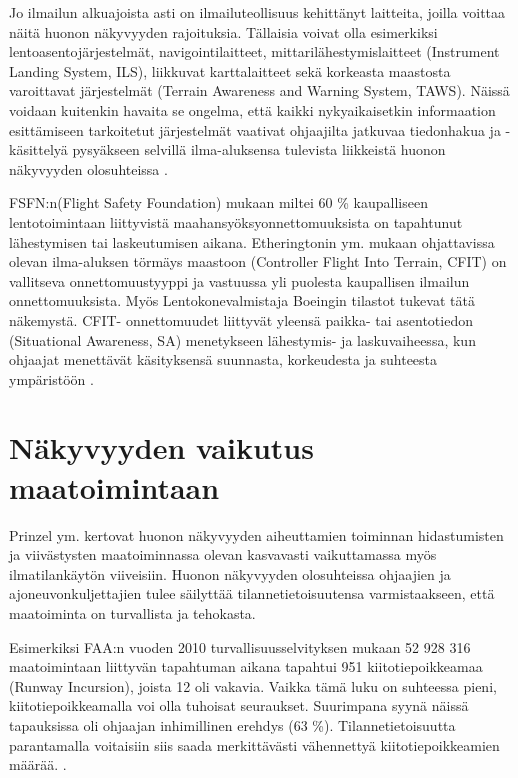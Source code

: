 \documentclass[utf8,bachelor,manualbib]{gradu3}
\begin{document}
Jo ilmailun alkuajoista asti on ilmailuteollisuus kehittänyt laitteita, joilla voittaa näitä huonon näkyvyyden rajoituksia. Tällaisia voivat olla esimerkiksi lentoasentojärjestelmät, navigointilaitteet, mittarilähestymislaitteet (Instrument Landing System, ILS), liikkuvat karttalaitteet sekä korkeasta maastosta varoittavat järjestelmät (Terrain Awareness and Warning System, TAWS). Näissä voidaan kuitenkin havaita se ongelma, että kaikki nykyaikaisetkin informaation esittämiseen tarkoitetut järjestelmät vaativat ohjaajilta jatkuvaa tiedonhakua ja -käsittelyä pysyäkseen selvillä ilma-aluksensa tulevista liikkeistä huonon näkyvyyden olosuhteissa \citep {prinzel2004}.

FSFN:n(Flight Safety Foundation) mukaan miltei 60 \% kaupalliseen lentotoimintaan liittyvistä maahansyöksyonnettomuuksista on tapahtunut lähestymisen tai laskeutumisen aikana. Etheringtonin ym. \citeyearpar{etherington2000} mukaan ohjattavissa olevan ilma-aluksen törmäys maastoon (Controller Flight Into Terrain, CFIT) on vallitseva onnettomuustyyppi ja vastuussa yli puolesta kaupallisen ilmailun onnettomuuksista. Myös Lentokonevalmistaja Boeingin \citeyearpar{boeing1996} tilastot tukevat tätä näkemystä. CFIT- onnettomuudet liittyvät yleensä paikka- tai asentotiedon (Situational Awareness, SA) menetykseen lähestymis- ja laskuvaiheessa, kun ohjaajat menettävät käsityksensä suunnasta, korkeudesta ja suhteesta ympäristöön \cite{schnellym2004}.

\section{Näkyvyyden vaikutus maatoimintaan}

Prinzel ym. \citeyearpar{prinzel2013} kertovat huonon näkyvyyden aiheuttamien toiminnan hidastumisten ja viivästysten maatoiminnassa olevan kasvavasti vaikuttamassa myös ilmatilankäytön viiveisiin. Huonon näkyvyyden olosuhteissa ohjaajien ja ajoneuvonkuljettajien tulee säilyttää tilannetietoisuutensa varmistaakseen, että maatoiminta on turvallista ja tehokasta.

Esimerkiksi FAA:n vuoden 2010 turvallisuusselvityksen mukaan 52 928 316 maatoimintaan liittyvän tapahtuman aikana tapahtui 951 kiitotiepoikkeamaa (Runway Incursion), joista 12 oli vakavia. Vaikka tämä luku on suhteessa pieni, kiitotiepoikkeamalla voi olla tuhoisat seuraukset. Suurimpana syynä näissä tapauksissa oli ohjaajan inhimillinen erehdys (63 \%). Tilannetietoisuutta parantamalla voitaisiin siis saada merkittävästi vähennettyä kiitotiepoikkeamien määrää. \citep{prinzel2013}.
\end{document}
